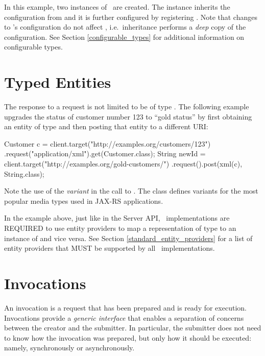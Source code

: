 In this example, two instances of \WebTarget\ are created. The instance  inherits the configuration from  and it is further configured by registering . Note that changes to 's configuration do not affect , i.e.~inheritance performs a {\em deep} copy of the configuration. See Section \ref{configurable_types} for additional information on configurable types.

\section{Typed Entities}

The response to a request is not limited to be of type \Response. The following example upgrades the status of customer number 123 to ``gold status'' by first obtaining an entity of type  and then posting that entity to a different URI:

\begin{listing}{1}
Customer c = client.target("http://examples.org/customers/123")
    .request("application/xml").get(Customer.class);
String newId = client.target("http://examples.org/gold-customers/")
    .request().post(xml(c), String.class);
\end{listing}

Note the use of the {\em variant}  in the call to . The class  defines variants for the most popular media types used in JAX-RS applications.

In the example above, just like in the Server API, \jaxrs\ implementations are REQUIRED to use entity providers to map a representation of type  to an instance of  and vice versa. See Section \ref{standard_entity_providers} for a list of entity providers that MUST be supported by all \jaxrs\ implementations.

\section{Invocations}
\label{invocations}

An invocation is a request that has been prepared and is ready for execution. Invocations provide a {\em generic interface} that enables a separation of concerns between the creator and the submitter. In particular, the submitter does not need to know how the invocation was prepared, but only how it should be executed: namely, synchronously or asynchronously.


